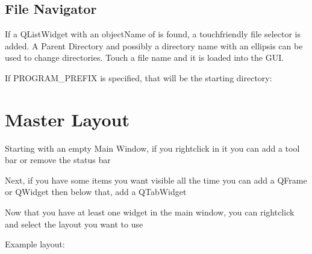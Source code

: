 \documentclass[letterpaper,10pt,english]{sphinxmanual}
\begin{document}
\section{File Navigator}
\label{\detokenize{touch:file-navigator}}
\sphinxAtStartPar
If a QListWidget with an objectName of  is found, a touch\sphinxhyphen{}friendly
file selector is added. A Parent Directory and possibly a directory name with
an ellipsis can be used to change directories. Touch a file name and it is
loaded into the GUI.

\sphinxAtStartPar
If PROGRAM\_PREFIX is specified, that will be the starting directory:


\sphinxstepscope


\chapter{Master Layout}
\label{\detokenize{layout:master-layout}}\label{\detokenize{layout::doc}}
\sphinxAtStartPar
Starting with an empty Main Window, if you right\sphinxhyphen{}click in it you can add a tool
bar or remove the status bar


\sphinxAtStartPar
Next, if you have some items you want visible all the time you can add a QFrame
or QWidget then below that, add a QTabWidget


\sphinxAtStartPar
Now that you have at least one widget in the main window, you can right\sphinxhyphen{}click
and select the layout you want to use


\sphinxAtStartPar
Example layout:

\end{document}
